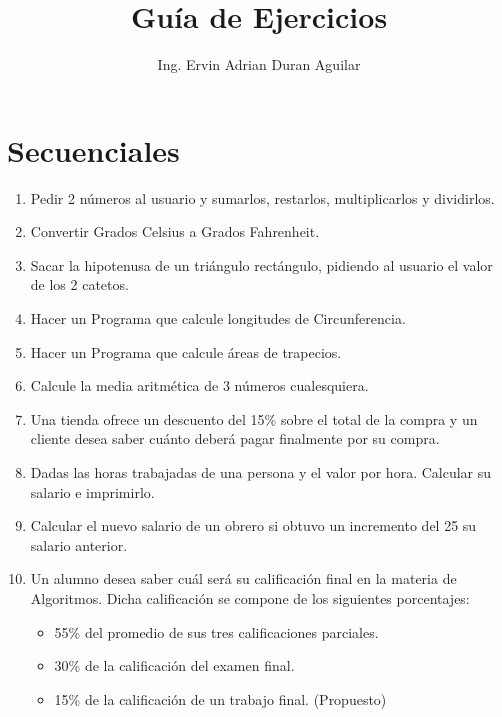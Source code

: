 \documentclass{scrartcl}
\title{Guía de Ejercicios}
\author{Ing. Ervin Adrian Duran Aguilar}
\date{}
\begin{document}
	\maketitle
	\section{Secuenciales}
	
	\begin{enumerate}
		
		\item Pedir 2 números al usuario y sumarlos, restarlos, multiplicarlos y dividirlos.
		
		\item Convertir Grados Celsius a Grados Fahrenheit.
		
		\item Sacar la hipotenusa de un triángulo rectángulo, pidiendo al usuario el valor de los 2 catetos.
		
		\item Hacer un Programa que calcule longitudes de Circunferencia.

		\item Hacer un Programa que calcule áreas de trapecios.
		
		\item Calcule la media aritmética de 3 números cualesquiera.
		
		\item Una tienda ofrece un descuento del 15\% sobre el total de la compra y un cliente desea saber cuánto deberá pagar finalmente por su compra.
		
		\item Dadas las horas trabajadas de una persona y el valor por hora. Calcular su
		salario e imprimirlo.
		
		\item Calcular el nuevo salario de un obrero si obtuvo un incremento del 25%
		su salario anterior.
		
		\item Un alumno desea saber cuál será su calificación final en la materia de	Algoritmos. Dicha calificación se compone de los siguientes porcentajes:
		
			\begin{itemize}
					\item 55\% del promedio de sus tres calificaciones parciales.
					\item 30\% de la calificación del examen final.
					\item 15\% de la calificación de un trabajo final. (Propuesto)				
			\end{itemize}


\end{enumerate}
\end{document}
